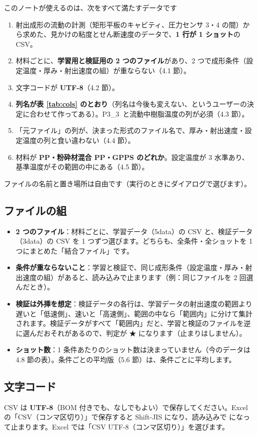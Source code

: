 \documentclass[paper=a4paper,fontsize=10.5pt,line_length=44zw,number_of_lines=38]{jlreq}
\newcommand{\file}[1]{\texttt{\detokenize{#1}}}
\newcommand{\PIII}{P3\_3}
\newenvironment{points}{\begin{itemize}[label=$\triangleright$,leftmargin=1.5\zw,itemsep=0.3ex,topsep=0.5ex,parsep=0pt]}{\end{itemize}}
\newcommand{\pt}[1]{\item \textbf{#1}：}
\begin{document}
\begin{keybox}{このノートが使えるのは、次をすべて満たすデータです}
\begin{enumerate}[leftmargin=1.8\zw,itemsep=0.2ex,topsep=0.2ex]
\item 射出成形の流動の計測（矩形平板のキャビティ、圧力センサ 3・4 の間）から求めた、見かけの粘度とせん断速度のデータで、\textbf{1 行が 1 ショット}の CSV。
\item 材料ごとに、\textbf{学習用と検証用の 2 つのファイル}があり、2 つで成形条件（設定温度・厚み・射出速度の組）が重ならない（4.1 節）。
\item 文字コードが \textbf{UTF-8}（4.2 節）。
\item \textbf{列名が表 \ref{tab:cols} のとおり}（列名は今後も変えない、というユーザーの決定に合わせて作ってある）。\PIII\ と流動中樹脂温度の列が必須（4.3 節）。
\item 「元ファイル」の列が、決まった形式のファイル名で、厚み・射出速度・設定温度の列と食い違わない（4.4 節）。
\item 材料が \textbf{PP・粉砕材混合 PP・GPPS のどれか}。設定温度が 3 水準あり、基準温度がその範囲の中にある（4.5 節）。
\end{enumerate}
ファイルの名前と置き場所は自由です（実行のときにダイアログで選びます）。
\end{keybox}

\subsection{ファイルの組}
\begin{points}
\pt{2 つのファイル}材料ごとに、学習データ（5data）の CSV と、検証データ（3data）の CSV を 1 つずつ選びます。どちらも、全条件・全ショットを 1 つにまとめた「結合ファイル」です。
\pt{条件が重ならないこと}学習と検証で、同じ成形条件（設定温度・厚み・射出速度の組）があると、読み込みで止まります（例：同じファイルを 2 回選んだとき）。
\pt{検証は外挿を想定}検証データの各行は、学習データの射出速度の範囲より遅いと「低速側」、速いと「高速側」、範囲の中なら「範囲内」に分けて集計されます。検証データがすべて「範囲内」だと、学習と検証のファイルを逆に選んだおそれがあるので、判定が ★ になります（止まりはしません）。
\pt{ショット数}1 条件あたりのショット数は決まっていません（今のデータは 4.8 節の表）。条件ごとの平均版（5.6 節）は、条件ごとに平均します。
\end{points}

\subsection{文字コード}
CSV は \textbf{UTF-8}（BOM 付きでも、なしでもよい）で保存してください。Excel の「CSV（コンマ区切り）」で保存すると Shift-JIS になり、読み込みで \file{UnicodeDecodeError} になって止まります。Excel では「CSV UTF-8（コンマ区切り）」を選びます。
\end{document}

